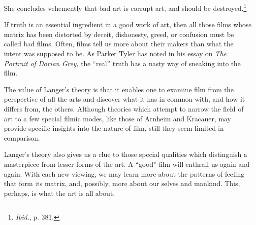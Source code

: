 \documentclass{tufte-handout}
\begin{document}
\noindent She concludes vehemently that bad art is corrupt art, and should be
de­stroyed.\footnote{\emph{Ibid.}, p. 381.}

If truth is an essential ingredient in a good work of art, then all
those films whose matrix has been distorted by deceit, dishonesty,
greed, or con­fusion must be called bad films. Often, films tell us more
about their makers than what the intent was supposed to be. As Parker
Tyler has noted in his essay on \emph{The Portrait of Dorian Grey,} the
``real'' truth has a nasty way of sneaking into the film.

The value of Langer's theory is that it enables one to examine film from
the perspective of all the arts and discover what it has in common with,
and how it differs from, the others. Although theories which attempt to
narrow the field of art to a few special filmic modes, like those of
Arnheim and Kracauer, may provide specific insights into the nature of
film, still they seem limited in comparison.

Langer's theory also gives us a clue to those special qualities which
dis­tinguish a masterpiece from lesser forms of the art. A ``good'' film
will en­thrall us again and again. With each new viewing, we may learn
more about the patterns of feeling that form its matrix, and, possibly,
more about our­ selves and mankind. This, perhaps, is what the art is all
about.
\end{document}
